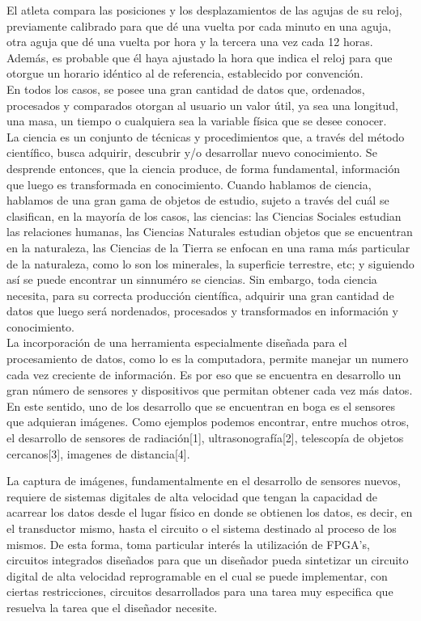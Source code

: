 El atleta compara las posiciones y los desplazamientos de las agujas de su reloj, previamente calibrado para que dé una vuelta por cada minuto en una aguja, otra aguja que dé una vuelta por hora y la tercera una vez cada 12 horas. Además, es probable que él haya ajustado la hora que indica el reloj para que otorgue un horario idéntico al de referencia, establecido por convención.\\

En todos los casos, se posee una gran cantidad de datos que, ordenados, procesados y comparados otorgan al usuario un valor útil, ya sea una longitud, una masa, un tiempo o cualquiera sea la variable física que se desee conocer.\\

La ciencia es un conjunto de técnicas y procedimientos que, a través del método científico, busca adquirir, descubrir y/o desarrollar nuevo conocimiento. Se desprende entonces, que la ciencia produce, de forma fundamental, información que luego es transformada en conocimiento. Cuando hablamos de ciencia, hablamos de una gran gama de objetos de estudio, sujeto a través del cuál se clasifican, en la mayoría de los casos, las ciencias: las Ciencias Sociales estudian las relaciones humanas, las Ciencias Naturales estudian objetos que se encuentran en la naturaleza, las Ciencias de la Tierra se enfocan en una rama más particular de la naturaleza, como lo son los minerales, la superficie terrestre, etc; y siguiendo así se puede encontrar un sinnuméro se ciencias. Sin embargo, toda ciencia necesita, para su correcta producción científica, adquirir una gran cantidad de datos que luego será nordenados, procesados y transformados en información y conocimiento.\\

La incorporación de una herramienta especialmente diseñada para el procesamiento de datos, como lo es la computadora, permite manejar un numero cada vez creciente de información.
Es por eso que se encuentra en desarrollo un gran número de sensores y dispositivos que permitan obtener cada vez más datos.\\

En este sentido, uno de los desarrollo que se encuentran en boga es el sensores que adquieran imágenes. Como ejemplos podemos encontrar, entre muchos otros, el desarrollo de sensores de radiación[1], ultrasonografía[2], telescopía de objetos cercanos[3], imagenes de distancia[4].

La captura de imágenes, fundamentalmente en el desarrollo de sensores nuevos, requiere de sistemas digitales de alta velocidad que tengan la capacidad de acarrear los datos desde el lugar físico en donde se obtienen los datos, es decir, en el transductor mismo, hasta el circuito o el sistema destinado al proceso de los mismos. De esta forma, toma particular interés la utilización de FPGA's, circuitos integrados diseñados para que un diseñador pueda sintetizar un circuito digital de alta velocidad reprogramable en el cual se puede implementar, con ciertas restricciones, circuitos desarrollados para una tarea muy especifica que resuelva la tarea que el diseñador necesite.\\

